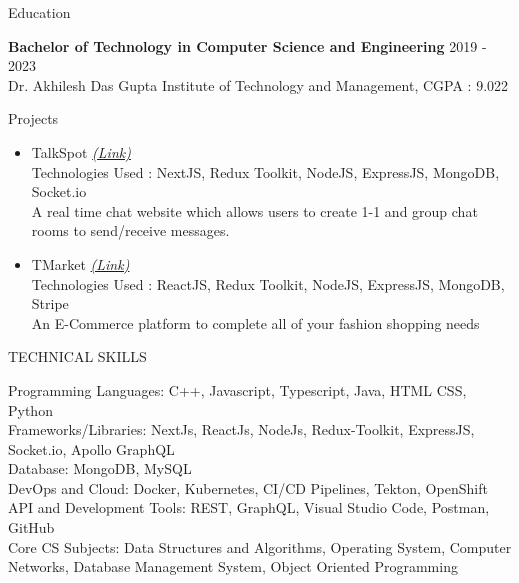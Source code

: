 \documentclass{resume} %
\begin{document}
\begin{rSection}{Education}

{\bf Bachelor of Technology in Computer Science and Engineering} \hfill {2019 - 2023}
\\ 
{\normalfont Dr. Akhilesh Das Gupta Institute of Technology and Management}, {\normalfont CGPA : 9.022} 

\end{rSection}
 


\begin{rSection}{Projects}
   \begin{itemize}

    \item TalkSpot
   \href{https://github.com/tushargahlaut/talkspot-chat-app}{\emph{(Link)}} 
   \\Technologies Used : NextJS, Redux Toolkit, NodeJS, ExpressJS, MongoDB, Socket.io 
   \\{\normalfont A real time chat website which allows users to create 1-1 and group chat rooms to send/receive messages.}
   
   \item TMarket
   \href{https://github.com/tushargahlaut/TMarket}{\emph{(Link)}}
   \\Technologies Used : ReactJS, Redux Toolkit, NodeJS, ExpressJS, MongoDB, Stripe
   \\{\normalfont An E-Commerce platform to complete all of your fashion shopping needs}
   
   \end{itemize}
\end{rSection}

\begin{rSection}{TECHNICAL SKILLS}




Programming Languages: {\normalfont C++, Javascript, Typescript, Java, HTML CSS, Python}
\\
Frameworks/Libraries: {\normalfont NextJs, ReactJs, NodeJs, Redux-Toolkit, ExpressJS,  Socket.io, Apollo GraphQL}
 \\
 Database: {\normalfont MongoDB, MySQL}
 \\
 DevOps and Cloud: {\normalfont Docker, Kubernetes, CI/CD Pipelines, Tekton, OpenShift}
 \\
 API and Development Tools: {\normalfont REST, GraphQL, Visual Studio Code, Postman, GitHub}
 \\
 Core CS Subjects: {\normalfont Data Structures and Algorithms, Operating System, Computer Networks, Database Management System, Object Oriented Programming}

\end{rSection}
\end{document}
